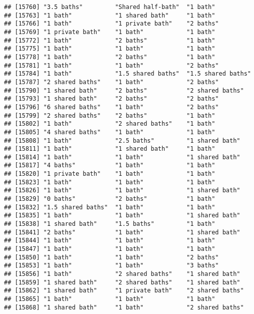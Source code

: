 \documentclass[
]{article}
\begin{document}
\begin{verbatim}
## [15760] "3.5 baths"         "Shared half-bath"  "1 bath"           
## [15763] "1 bath"            "1 shared bath"     "1 bath"           
## [15766] "1 bath"            "1 private bath"    "2 baths"          
## [15769] "1 private bath"    "1 bath"            "1 bath"           
## [15772] "1 bath"            "2 baths"           "1 bath"           
## [15775] "1 bath"            "1 bath"            "1 bath"           
## [15778] "1 bath"            "2 baths"           "1 bath"           
## [15781] "1 bath"            "1 bath"            "2 baths"          
## [15784] "1 bath"            "1.5 shared baths"  "1.5 shared baths" 
## [15787] "2 shared baths"    "1 bath"            "2 baths"          
## [15790] "1 shared bath"     "2 baths"           "2 shared baths"   
## [15793] "1 shared bath"     "2 baths"           "2 baths"          
## [15796] "6 shared baths"    "1 bath"            "2 baths"          
## [15799] "2 shared baths"    "2 baths"           "1 bath"           
## [15802] "1 bath"            "2 shared baths"    "1 bath"           
## [15805] "4 shared baths"    "1 bath"            "1 bath"           
## [15808] "1 bath"            "2.5 baths"         "1 shared bath"    
## [15811] "1 bath"            "1 shared bath"     "1 bath"           
## [15814] "1 bath"            "1 bath"            "1 shared bath"    
## [15817] "4 baths"           "1 bath"            "1 bath"           
## [15820] "1 private bath"    "1 bath"            "1 bath"           
## [15823] "1 bath"            "1 bath"            "1 bath"           
## [15826] "1 bath"            "1 bath"            "1 shared bath"    
## [15829] "0 baths"           "2 baths"           "1 bath"           
## [15832] "1.5 shared baths"  "1 bath"            "1 bath"           
## [15835] "1 bath"            "1 bath"            "1 shared bath"    
## [15838] "1 shared bath"     "1.5 baths"         "1 bath"           
## [15841] "2 baths"           "1 bath"            "1 shared bath"    
## [15844] "1 bath"            "1 bath"            "1 bath"           
## [15847] "1 bath"            "1 bath"            "1 bath"           
## [15850] "1 bath"            "1 bath"            "2 baths"          
## [15853] "1 bath"            "1 bath"            "3 baths"          
## [15856] "1 bath"            "2 shared baths"    "1 shared bath"    
## [15859] "1 shared bath"     "2 shared baths"    "1 shared bath"    
## [15862] "1 shared bath"     "1 private bath"    "2 shared baths"   
## [15865] "1 bath"            "1 bath"            "1 bath"           
## [15868] "1 shared bath"     "1 bath"            "2 shared baths"   

\end{verbatim}
\end{document}
